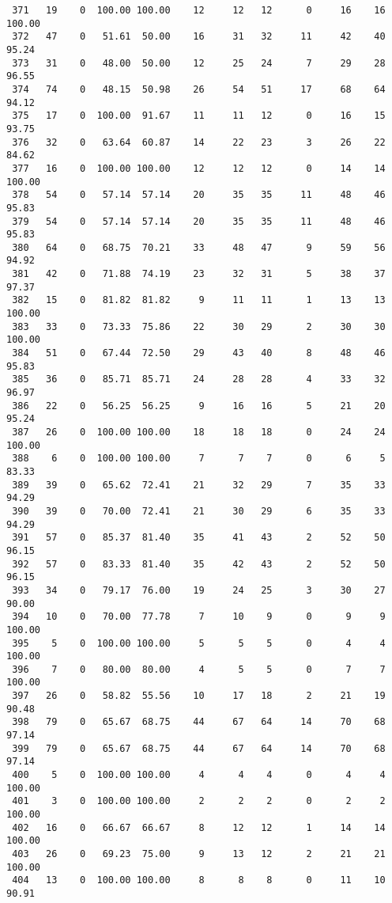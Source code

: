 \begin{verbatim}
 371   19    0  100.00 100.00    12     12   12      0     16    16   100.00
 372   47    0   51.61  50.00    16     31   32     11     42    40    95.24
 373   31    0   48.00  50.00    12     25   24      7     29    28    96.55
 374   74    0   48.15  50.98    26     54   51     17     68    64    94.12
 375   17    0  100.00  91.67    11     11   12      0     16    15    93.75
 376   32    0   63.64  60.87    14     22   23      3     26    22    84.62
 377   16    0  100.00 100.00    12     12   12      0     14    14   100.00
 378   54    0   57.14  57.14    20     35   35     11     48    46    95.83
 379   54    0   57.14  57.14    20     35   35     11     48    46    95.83
 380   64    0   68.75  70.21    33     48   47      9     59    56    94.92
 381   42    0   71.88  74.19    23     32   31      5     38    37    97.37
 382   15    0   81.82  81.82     9     11   11      1     13    13   100.00
 383   33    0   73.33  75.86    22     30   29      2     30    30   100.00
 384   51    0   67.44  72.50    29     43   40      8     48    46    95.83
 385   36    0   85.71  85.71    24     28   28      4     33    32    96.97
 386   22    0   56.25  56.25     9     16   16      5     21    20    95.24
 387   26    0  100.00 100.00    18     18   18      0     24    24   100.00
 388    6    0  100.00 100.00     7      7    7      0      6     5    83.33
 389   39    0   65.62  72.41    21     32   29      7     35    33    94.29
 390   39    0   70.00  72.41    21     30   29      6     35    33    94.29
 391   57    0   85.37  81.40    35     41   43      2     52    50    96.15
 392   57    0   83.33  81.40    35     42   43      2     52    50    96.15
 393   34    0   79.17  76.00    19     24   25      3     30    27    90.00
 394   10    0   70.00  77.78     7     10    9      0      9     9   100.00
 395    5    0  100.00 100.00     5      5    5      0      4     4   100.00
 396    7    0   80.00  80.00     4      5    5      0      7     7   100.00
 397   26    0   58.82  55.56    10     17   18      2     21    19    90.48
 398   79    0   65.67  68.75    44     67   64     14     70    68    97.14
 399   79    0   65.67  68.75    44     67   64     14     70    68    97.14
 400    5    0  100.00 100.00     4      4    4      0      4     4   100.00
 401    3    0  100.00 100.00     2      2    2      0      2     2   100.00
 402   16    0   66.67  66.67     8     12   12      1     14    14   100.00
 403   26    0   69.23  75.00     9     13   12      2     21    21   100.00
 404   13    0  100.00 100.00     8      8    8      0     11    10    90.91

\end{verbatim}
